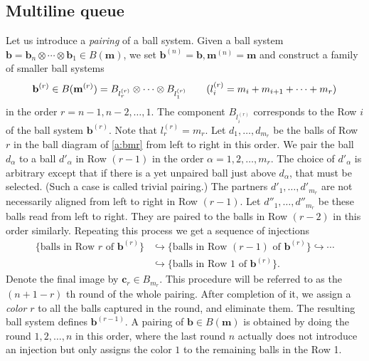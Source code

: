 \documentclass[11pt]{article}
\theoremstyle{definition}
\numberwithin{equation}{section}
\newcommand{\bb}{\mathbf{b}}
\newcommand{\cc}{\mathbf{c}}
\newcommand{\mm}{\mathbf{m}}
\newcommand{\defn}[1]{{\color{blue}\emph{#1}}}
\begin{document}
\subsection{Multiline queue}\label{subsec:mq}
Let us introduce a \defn{pairing} of a ball system.
Given a ball system
$\bb = \bb_n \otimes \cdots \otimes \bb_1 \in B(\mm)$,
we set $\bb^{(n)} = \bb, \mm^{(n)}= \mm$ and 
construct a family of smaller ball systems 
\begin{align}\label{a:bmr}
\bb^{(r)} \in B({\bf m}^{(r)}) = B_{l^{(r)}_r} \otimes  \cdots \otimes 
B_{l^{(r)}_1}\qquad  (l^{(r)}_i=m_i+m_{i+1}+\cdots + m_r)
\end{align}
 in the order $r=n-1, n-2,\ldots, 1$.
The component $B_{l^{(r)}_i}$ corresponds to the Row $i$ of the ball system $\bb^{(r)}$.
Note that $l^{(r)}_r=m_r$.
Let $d_1,\ldots, d_{m_r}$ be the balls of Row $r$ in the ball diagram of \eqref{a:bmr} from left to right in this order.
We pair the ball $d_\alpha$ to a ball $d'_\alpha$ in Row $(r-1)$ in the order $\alpha=1,2,\ldots, m_r$.
The choice of $d'_\alpha$ is arbitrary except that if there is a yet unpaired ball just above $d_\alpha$,
that must be selected.  (Such a case is called trivial pairing.)
The partners $d'_1,\ldots, d'_{m_r}$ are not necessarily aligned from left to right 
in Row $(r-1)$.
Let $d''_1,\ldots, d''_{m_r}$ be these balls read from left to right.
They are paired to the balls in Row $(r-2)$ in this order similarly.
Repeating this process we get a sequence of injections 
\begin{equation}
\label{a:cr}
\begin{aligned}
 \{ \text{balls in Row $r$ of $\bb^{(r)}$} \} &\hookrightarrow 
 \{ \text{balls in Row $(r-1)$ of $\bb^{(r)}$} \}
 \hookrightarrow \cdots \\ & \hookrightarrow 
 \{ \text{balls in Row $1$ of $\bb^{(r)}$} \}.
 \end{aligned}
\end{equation}
Denote the final image by $\cc_r \in B_{m_r}$.
This procedure will be referred to as the $(n+1-r)$ th round  of the whole pairing.
After completion of it, we assign a \defn{color} $r$ to all the balls captured in the round, and 
eliminate them. The resulting ball system defines $\bb^{(r-1)}$.
A pairing of $\bb \in B(\mm)$ is obtained by doing the round  $1, 2, \ldots, n$ in this order,
where the  last round $n$ actually does not introduce an injection but only 
assigns the color $1$ to the remaining balls in the Row 1.
\end{document}
